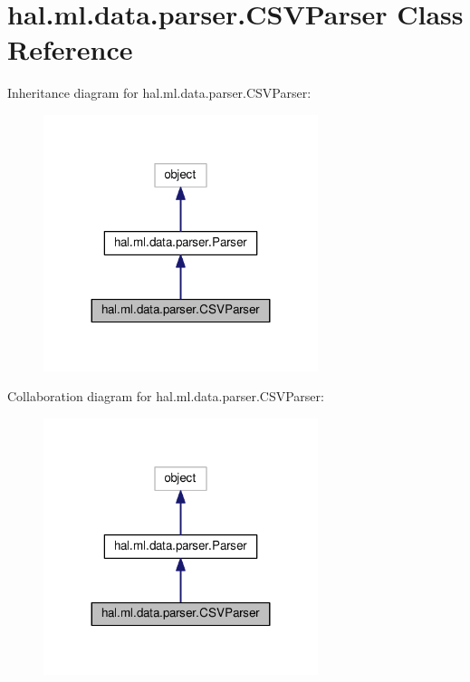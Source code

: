 \hypertarget{classhal_1_1ml_1_1data_1_1parser_1_1_c_s_v_parser}{}\section{hal.\+ml.\+data.\+parser.\+C\+S\+V\+Parser Class Reference}
\label{classhal_1_1ml_1_1data_1_1parser_1_1_c_s_v_parser}


Inheritance diagram for hal.\+ml.\+data.\+parser.\+C\+S\+V\+Parser\+:\nopagebreak
\begin{figure}[H]
\begin{center}
\leavevmode
\includegraphics[width=227pt]{classhal_1_1ml_1_1data_1_1parser_1_1_c_s_v_parser__inherit__graph}
\end{center}
\end{figure}


Collaboration diagram for hal.\+ml.\+data.\+parser.\+C\+S\+V\+Parser\+:\nopagebreak
\begin{figure}[H]
\begin{center}
\leavevmode
\includegraphics[width=227pt]{classhal_1_1ml_1_1data_1_1parser_1_1_c_s_v_parser__coll__graph}
\end{center}
\end{figure}
